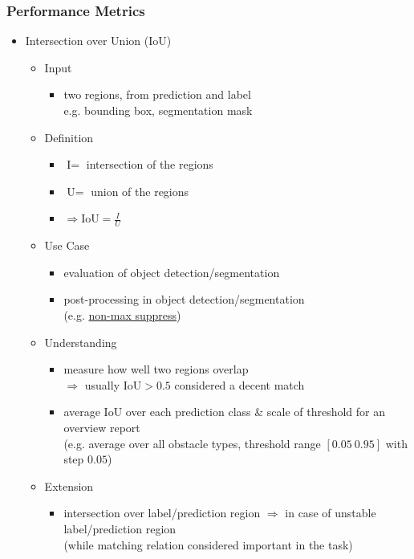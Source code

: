 \subsubsection{Performance Metrics}
\begin{itemize}
\item Intersection over Union (IoU)
	\begin{itemize}
	\item Input
		\begin{itemize}
		\item two regions, from prediction and label \\
		e.g. bounding box, segmentation mask
		\end{itemize}
	\item Definition
		\begin{itemize}
		\item $\text{I}=$ intersection of the regions
		\item $\text{U}=$ union of the regions
		\item $\Rightarrow \text{IoU} = \frac I U$ 
		\end{itemize}
	\item Use Case
		\begin{itemize}
		\item evaluation of object detection/segmentation
		\item post-processing in object detection/segmentation \\
		(e.g. \hyperref[DL_CV_Objdet_nonmax]{non-max suppress})
		\end{itemize}
	\item Understanding
		\begin{itemize}
		\item measure how well two regions overlap \\
		$\Rightarrow$ usually $\text{IoU}>0.5$ considered a decent match
		\item average IoU over each prediction class \& scale of threshold for an overview report \\
		(e.g. average over all obstacle types, threshold range $[0.05~0.95]$ with step $0.05$)
		\end{itemize}
	\item Extension
		\begin{itemize}
		\item intersection over label/prediction region $\Rightarrow$ in case of unstable label/prediction region \\ 
		(while matching relation considered important in the task)

\end{itemize}
\end{itemize}
\end{itemize}
